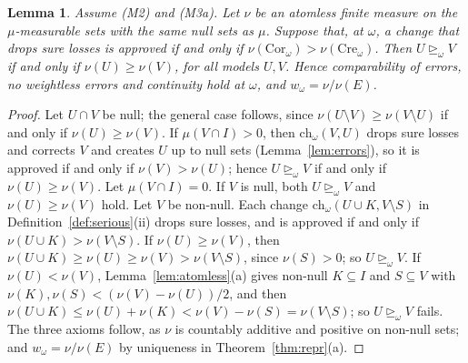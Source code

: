 \documentclass[11pt]{article}
\newtheorem{lemma}[theorem]{Lemma}
\theoremstyle{definition}
\newcommand{\Cor}{\mathrm{Cor}}
\newcommand{\Cre}{\mathrm{Cre}}
\newcommand{\ch}{\mathrm{ch}}
\newcommand{\sge}{\trianglerighteq}
\begin{document}
\begin{lemma}\label{lem:reading}
Assume (M2) and (M3a). Let $\nu$ be an atomless finite measure on the $\mu$-measurable sets with the same null sets as $\mu$. Suppose that, at $\omega$, a change that drops sure losses is approved if and only if $\nu(\Cor_\omega)>\nu(\Cre_\omega)$. Then $U\sge_\omega V$ if and only if $\nu(U)\ge\nu(V)$, for all models $U,V$. Hence comparability of errors, no weightless errors and continuity hold at $\omega$, and $w_\omega=\nu/\nu(E)$.
\end{lemma}
\begin{proof}
Let $U\cap V$ be null; the general case follows, since $\nu(U\setminus V)\ge\nu(V\setminus U)$ if and only if $\nu(U)\ge\nu(V)$. If $\mu(V\cap I)>0$, then $\ch_\omega(V,U)$ drops sure losses and corrects $V$ and creates $U$ up to null sets (Lemma~\ref{lem:errors}), so it is approved if and only if $\nu(V)>\nu(U)$; hence $U\sge_\omega V$ if and only if $\nu(U)\ge\nu(V)$. Let $\mu(V\cap I)=0$. If $V$ is null, both $U\sge_\omega V$ and $\nu(U)\ge\nu(V)$ hold. Let $V$ be non-null. Each change $\ch_\omega(U\cup K,V\setminus S)$ in Definition~\ref{def:serious}(ii) drops sure losses, and is approved if and only if $\nu(U\cup K)>\nu(V\setminus S)$. If $\nu(U)\ge\nu(V)$, then $\nu(U\cup K)\ge\nu(U)\ge\nu(V)>\nu(V\setminus S)$, since $\nu(S)>0$; so $U\sge_\omega V$. If $\nu(U)<\nu(V)$, Lemma~\ref{lem:atomless}(a) gives non-null $K\subseteq I$ and $S\subseteq V$ with $\nu(K),\nu(S)<(\nu(V)-\nu(U))/2$, and then $\nu(U\cup K)\le\nu(U)+\nu(K)<\nu(V)-\nu(S)=\nu(V\setminus S)$; so $U\sge_\omega V$ fails. The three axioms follow, as $\nu$ is countably additive and positive on non-null sets; and $w_\omega=\nu/\nu(E)$ by uniqueness in Theorem~\ref{thm:repr}(a).
\end{proof}
\end{document}
